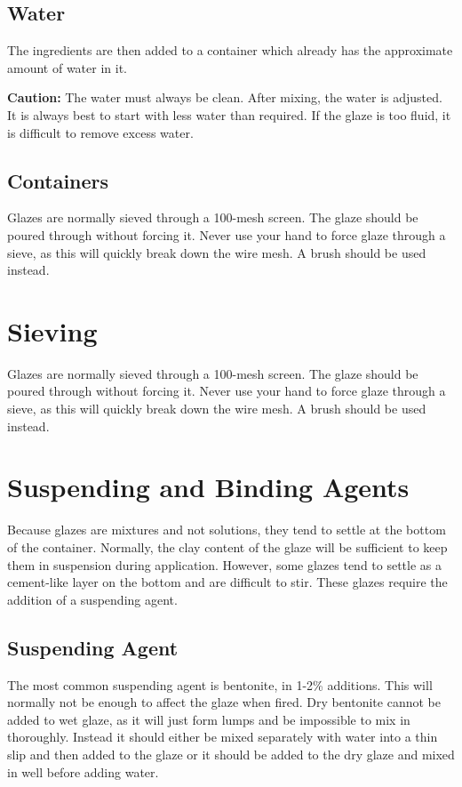 \subsection{Water}
The ingredients are then added to a container which already has the approximate 
amount of water in it. 

\textbf{Caution:} The water must always be clean. After mixing, the water is 
adjusted. It is always best to start with less water than required. If the 
glaze is too fluid, it is difficult to remove excess water.
\subsection{Containers}
Glazes are normally sieved through a 100-mesh screen. The glaze should be 
poured through without forcing it. Never use your hand to force glaze through a 
sieve, as this will quickly break down the wire mesh. A brush should be used 
instead.
\section{Sieving}
Glazes are normally sieved through a 100-mesh screen. The glaze should be 
poured through without forcing it. Never use your hand to force glaze through a 
sieve, as this will quickly break down the wire mesh. A brush should be used 
instead.
\section{Suspending and Binding Agents}
Because glazes are mixtures and not solutions, they tend to settle at the 
bottom of the container. Normally, the clay content of the glaze will be 
sufficient to keep them in suspension during application. However, some glazes 
tend to settle as a cement-like layer on the bottom and are difficult to stir. 
These glazes require the addition of a suspending agent.
\subsection{Suspending Agent}
The most common suspending agent is bentonite, in 1-2\% additions. This will 
normally not be enough to affect the glaze when fired. Dry bentonite cannot be 
added to wet glaze, as it will just form lumps and be impossible to mix in 
thoroughly. Instead it should either be mixed separately with water into a thin 
slip and then added to the glaze or it should be added to the dry glaze and 
mixed in well before adding water.
